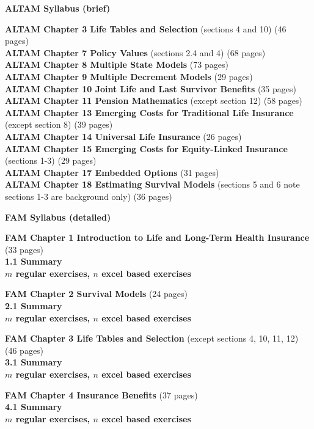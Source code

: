 \documentclass[hidelinks, 12pt]{article}
\theoremstyle{mydefstyle}
\theoremstyle{mythmstyle}
\begin{document}
\begin{center}
\textbf{ALTAM Syllabus (brief)}
\end{center}

\textbf{ALTAM Chapter 3 Life Tables and Selection} (sections 4 and 10) (46 pages) \\
\textbf{ALTAM Chapter 7 Policy Values} (sections 2.4 and 4) (68 pages) \\
\textbf{ALTAM Chapter 8 Multiple State Models} (73 pages) \\
\textbf{ALTAM Chapter 9 Multiple Decrement Models} (29 pages) \\
\textbf{ALTAM Chapter 10 Joint Life and Last Survivor Benefits} (35 pages) \\
\textbf{ALTAM Chapter 11 Pension Mathematics} (except section 12) (58 pages) \\
\textbf{ALTAM Chapter 13 Emerging Costs for Traditional Life Insurance} (except section 8) (39 pages) \\
\textbf{ALTAM Chapter 14 Universal Life Insurance} (26 pages) \\
\textbf{ALTAM Chapter 15 Emerging Costs for Equity-Linked Insurance} (sections 1-3) (29 pages) \\
\textbf{ALTAM Chapter 17 Embedded Options} (31 pages) \\
\textbf{ALTAM Chapter 18 Estimating Survival Models} (sections 5 and 6 note sections 1-3 are background only) (36 pages)

\newpage

\begin{center}
\textbf{FAM Syllabus (detailed)}
\end{center}

\textbf{FAM Chapter 1 Introduction to Life and Long-Term Health Insurance} (33 pages) \\
\textbf{1.1 Summary} \\
\textbf{$m$ regular exercises, $n$ excel based exercises}

\textbf{FAM Chapter 2 Survival Models} (24 pages) \\
\textbf{2.1 Summary} \\
\textbf{$m$ regular exercises, $n$ excel based exercises}

\textbf{FAM Chapter 3 Life Tables and Selection} (except sections 4, 10, 11, 12) (46 pages) \\
\textbf{3.1 Summary} \\
\textbf{$m$ regular exercises, $n$ excel based exercises}

\textbf{FAM Chapter 4 Insurance Benefits} (37 pages) \\
\textbf{4.1 Summary} \\
\textbf{$m$ regular exercises, $n$ excel based exercises}
\end{document}
